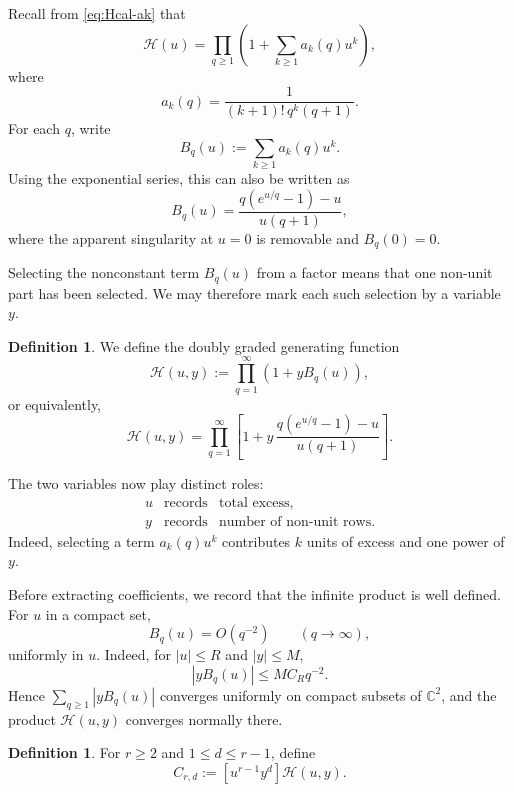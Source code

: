 \documentclass[11pt]{article}
\theoremstyle{definition}
\newtheorem{definition}[theorem]{Definition}
\begin{document}
Recall from \eqref{eq:Hcal-ak} that
\[
 \mathcal H(u)
 =
 \prod_{q\geq1}
 \left(
 1+\sum_{k\geq1}a_k(q)u^k
 \right),
\]
where
\[
        a_k(q)
        =
        \frac{1}{(k+1)!\,q^k(q+1)}.
\]
For each $q$, write
\begin{equation}\label{eq:Bq}
 B_q(u)
 :=
 \sum_{k\geq1}a_k(q)u^k.
\end{equation}
Using the exponential series, this can also be written as
\begin{equation}\label{eq:Bq-explicit}
 B_q(u)
 =
 \frac{q(e^{u/q}-1)-u}{u(q+1)},
\end{equation}
where the apparent singularity at $u=0$ is removable and
$B_q(0)=0$.

Selecting the nonconstant term $B_q(u)$ from a factor means that one
non-unit part has been selected.  We may therefore mark each such
selection by a variable $y$.

\begin{definition}
We define the doubly graded generating function
\begin{equation}\label{eq:Hscr}
 \mathscr H(u,y)
 :=
 \prod_{q=1}^\infty
 \left(1+yB_q(u)\right),
\end{equation}
or equivalently,
\[
 \mathscr H(u,y)
 =
 \prod_{q=1}^\infty
 \left[
 1+
 y\,\frac{q(e^{u/q}-1)-u}{u(q+1)}
 \right].
\]
\end{definition}

The two variables now play distinct roles:
\[
 \boxed{
 \begin{array}{ccl}
 u &\text{records}&\text{total excess},\\[1mm]
 y &\text{records}&\text{number of non-unit rows}.
 \end{array}}
\]
Indeed, selecting a term $a_k(q)u^k$ contributes $k$ units of excess
and one power of $y$.

Before extracting coefficients, we record that the infinite product
is well defined.  For $u$ in a compact set,
\[
        B_q(u)=O(q^{-2})
        \qquad(q\to\infty),
\]
uniformly in $u$. Indeed, for $|u|\leq R$ and $|y|\leq M$,
\[
        |yB_q(u)|\leq M C_R q^{-2}.
\]
Hence $\sum_{q\geq1}|yB_q(u)|$ converges uniformly on compact
subsets of $\mathbb C^2$, and the product
$\mathscr H(u,y)$ converges normally there.

\begin{definition}
For $r\geq2$ and $1\leq d\leq r-1$, define
\begin{equation}\label{eq:Crd}
        C_{r,d}
        :=
        [u^{r-1}y^d]\mathscr H(u,y).
\end{equation}
\end{definition}
\end{document}
